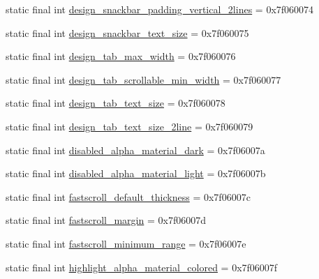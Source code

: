 \begin{DoxyCompactItemize}
\item 
static final int \mbox{\hyperlink{classandroid_1_1support_1_1design_1_1_r_1_1dimen_a763a99a7ed4d51adad516e2789989919}{design\+\_\+snackbar\+\_\+padding\+\_\+vertical\+\_\+2lines}} = 0x7f060074
\item 
static final int \mbox{\hyperlink{classandroid_1_1support_1_1design_1_1_r_1_1dimen_a52aa6de59674be234038a285bd18813e}{design\+\_\+snackbar\+\_\+text\+\_\+size}} = 0x7f060075
\item 
static final int \mbox{\hyperlink{classandroid_1_1support_1_1design_1_1_r_1_1dimen_a5b6cc64ba88e605a0388ebbfe495d251}{design\+\_\+tab\+\_\+max\+\_\+width}} = 0x7f060076
\item 
static final int \mbox{\hyperlink{classandroid_1_1support_1_1design_1_1_r_1_1dimen_a2edb69ba3cb024d1d650c6a62f96628e}{design\+\_\+tab\+\_\+scrollable\+\_\+min\+\_\+width}} = 0x7f060077
\item 
static final int \mbox{\hyperlink{classandroid_1_1support_1_1design_1_1_r_1_1dimen_aedbcd9d0b778f601a43eefd313738afa}{design\+\_\+tab\+\_\+text\+\_\+size}} = 0x7f060078
\item 
static final int \mbox{\hyperlink{classandroid_1_1support_1_1design_1_1_r_1_1dimen_a3c5c3229ecd1ba7f583b2aaf0ceb820f}{design\+\_\+tab\+\_\+text\+\_\+size\+\_\+2line}} = 0x7f060079
\item 
static final int \mbox{\hyperlink{classandroid_1_1support_1_1design_1_1_r_1_1dimen_abaf724b0a152c084b87b3a250eb9925e}{disabled\+\_\+alpha\+\_\+material\+\_\+dark}} = 0x7f06007a
\item 
static final int \mbox{\hyperlink{classandroid_1_1support_1_1design_1_1_r_1_1dimen_a5ff754097768daa1ae8597556ab0a5a5}{disabled\+\_\+alpha\+\_\+material\+\_\+light}} = 0x7f06007b
\item 
static final int \mbox{\hyperlink{classandroid_1_1support_1_1design_1_1_r_1_1dimen_aad2d8c6dd6e7367440c05d0a478b4520}{fastscroll\+\_\+default\+\_\+thickness}} = 0x7f06007c
\item 
static final int \mbox{\hyperlink{classandroid_1_1support_1_1design_1_1_r_1_1dimen_a20f52cacfc95f159caad4d48307c9c0c}{fastscroll\+\_\+margin}} = 0x7f06007d
\item 
static final int \mbox{\hyperlink{classandroid_1_1support_1_1design_1_1_r_1_1dimen_a793c85c872de5a1c75da36ee72d86c9e}{fastscroll\+\_\+minimum\+\_\+range}} = 0x7f06007e
\item 
static final int \mbox{\hyperlink{classandroid_1_1support_1_1design_1_1_r_1_1dimen_a844066f047b47ae2ef832ac7e8ece4c2}{highlight\+\_\+alpha\+\_\+material\+\_\+colored}} = 0x7f06007f

\end{DoxyCompactItemize}

